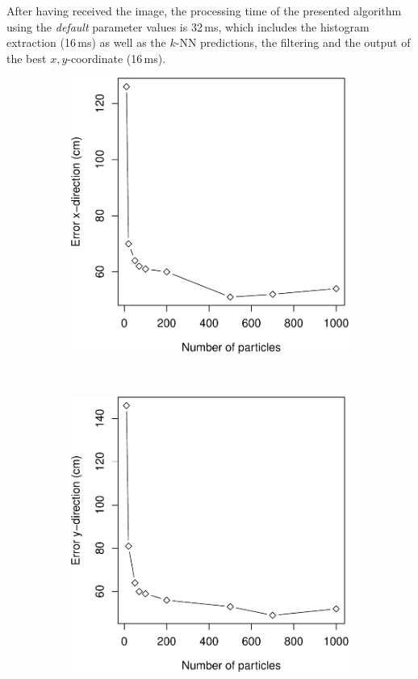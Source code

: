\documentclass[11pt]{report}
\begin{document}
After having received the image, the processing time of the presented
algorithm using the \emph{default} parameter values is 32\,ms, which
includes the histogram extraction (16\,ms) as well as the $k$-NN
predictions, the filtering and the output of the best $x,y$-coordinate
(16\,ms).

\begin{figure}[H]
  \centering
  \begin{subfigure}[b]{0.45\textwidth}
  \includegraphics[width=1\textwidth]{Error_x_particles-crop}
  \end{subfigure}%
~
  \begin{subfigure}[b]{0.45\textwidth}
  \includegraphics[width=1\textwidth]{Error_y_particles-crop}

\end{subfigure}
\end{figure}
\end{document}
